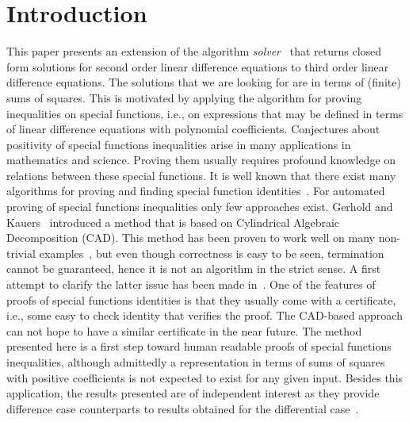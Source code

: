 \documentclass{article}
\begin{document}
\section{Introduction}
This paper presents an extension of the algorithm {\em solver}~\cite{YC11,CH09,CHG10} that
returns closed form solutions for second order linear difference equations to third order linear 
difference equations.  The solutions that we are looking for are in terms of (finite) sums
of squares. This is motivated by applying the algorithm for proving inequalities on
special functions, i.e., on expressions that may be defined in terms of linear difference
equations with polynomial coefficients. Conjectures about positivity of special functions
inequalities arise in many applications in mathematics and science. Proving them usually
requires profound knowledge on relations between these special functions. It is well known
that there exist many algorithms for proving and finding special function
identities~\cite{Zeil90a,ChyzakDM,AeqB,KoutschHF}. For automated proving of special
functions inequalities only few approaches exist. Gerhold and
Kauers~\cite{GKIneq,MKSumCracker} introduced a method that is based on Cylindrical
Algebraic Decomposition (CAD). This method has been proven to work well on many non-trivial
examples~\cite{MKTuran,VPSI}, but even though correctness is easy to be seen, termination
cannot be guaranteed, hence it is not an algorithm in the strict sense. A first attempt to
clarify the latter issue has been made in~\cite{MKVP10}. One of the features of proofs of
special functions identities is that they usually come with a certificate, i.e., some easy
to check identity that verifies the proof. The CAD-based approach can not hope to have a
similar certificate in the near future. The method presented here is a first step toward
human readable proofs of special functions inequalities, although admittedly a
representation in terms of sums of squares with positive coefficients is not expected to
exist for any given input. Besides this application, the results presented
  are of independent interest as they provide difference case counterparts to results obtained
  for the differential case~\cite{MS85, vH07}. 
\end{document}
